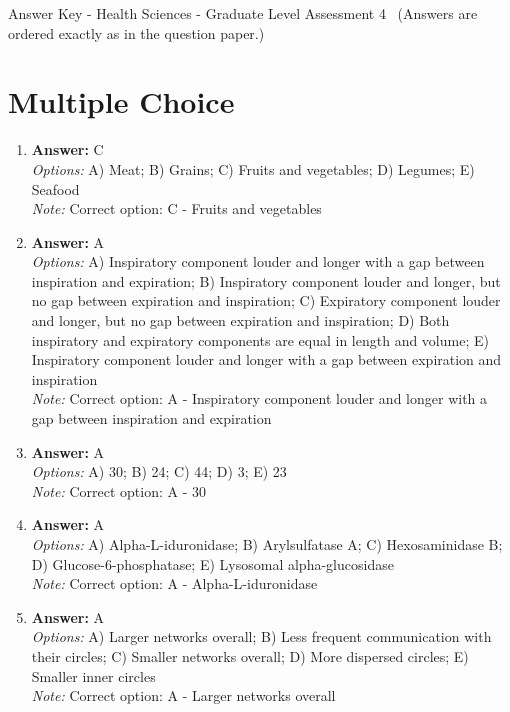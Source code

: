 \documentclass[12pt]{article}
\begin{document}
\begin{center}
Answer Key - Health Sciences - Graduate Level Assessment 4 \
\small (Answers are ordered exactly as in the question paper.)
\end{center}

\section*{Multiple Choice}
\begin{enumerate}[label=\arabic*.]
\item \textbf{Answer:} C
\\ \textit{Options:} A) Meat; B) Grains; C) Fruits and vegetables; D) Legumes; E) Seafood
\\ \textit{Note:} Correct option: C - Fruits and vegetables
\item \textbf{Answer:} A
\\ \textit{Options:} A) Inspiratory component louder and longer with a gap between inspiration and expiration; B) Inspiratory component louder and longer, but no gap between expiration and inspiration; C) Expiratory component louder and longer, but no gap between expiration and inspiration; D) Both inspiratory and expiratory components are equal in length and volume; E) Inspiratory component louder and longer with a gap between expiration and inspiration
\\ \textit{Note:} Correct option: A - Inspiratory component louder and longer with a gap between inspiration and expiration
\item \textbf{Answer:} A
\\ \textit{Options:} A) 30; B) 24; C) 44; D) 3; E) 23
\\ \textit{Note:} Correct option: A - 30
\item \textbf{Answer:} A
\\ \textit{Options:} A) Alpha-L-iduronidase; B) Arylsulfatase A; C) Hexosaminidase B; D) Glucose-6-phosphatase; E) Lysosomal alpha-glucosidase
\\ \textit{Note:} Correct option: A - Alpha-L-iduronidase
\item \textbf{Answer:} A
\\ \textit{Options:} A) Larger networks overall; B) Less frequent communication with their circles; C) Smaller networks overall; D) More dispersed circles; E) Smaller inner circles
\\ \textit{Note:} Correct option: A - Larger networks overall
\end{enumerate}
\end{document}
